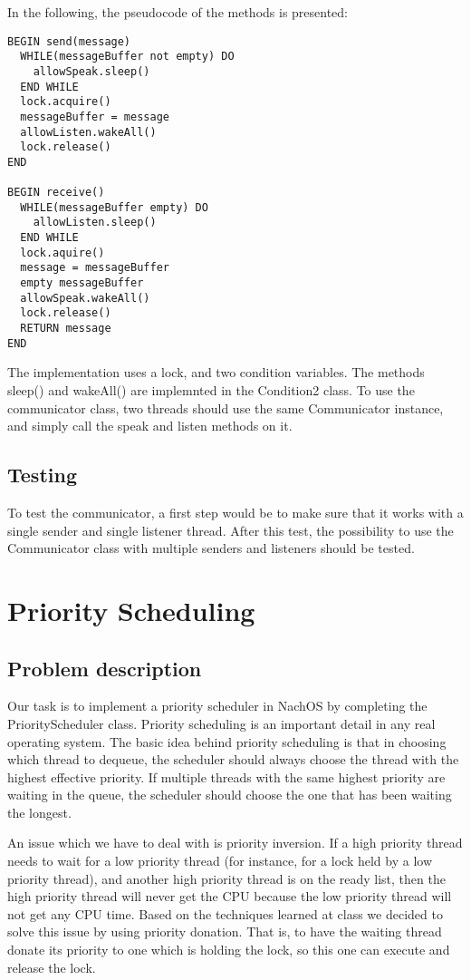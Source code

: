 \documentclass[a4paper,10pt]{article}
\begin{document}
In the following, the pseudocode of the methods is presented:

\begin{verbatim}
BEGIN send(message)
  WHILE(messageBuffer not empty) DO
    allowSpeak.sleep()
  END WHILE
  lock.acquire()
  messageBuffer = message
  allowListen.wakeAll()
  lock.release()
END

BEGIN receive()
  WHILE(messageBuffer empty) DO
    allowListen.sleep()
  END WHILE
  lock.aquire()
  message = messageBuffer
  empty messageBuffer
  allowSpeak.wakeAll()
  lock.release()
  RETURN message
END
\end{verbatim}

The implementation uses a lock, and two condition variables. The methods sleep() and wakeAll() are implemnted in the Condition2 class. To use the communicator class, two threads should use the same Communicator instance, and simply call the speak and listen methods on it.

\subsection{Testing}

To test the communicator, a first step would be to make sure that it works with a single sender and single listener thread. After this test, the possibility to use the Communicator class with multiple senders and listeners should be tested.

\section{Priority Scheduling}

\subsection{Problem description}

Our task is to implement a priority scheduler in NachOS by completing the PriorityScheduler class. Priority scheduling is an important detail in any real operating system. The basic idea behind priority scheduling is that in choosing which thread to dequeue, the scheduler should always choose the thread with the highest effective priority. If multiple threads with the same highest priority are waiting in the queue, the scheduler should choose the one that has been waiting the longest.

An issue which we have to deal with is priority inversion. If a high priority thread needs to wait for a low priority thread (for instance, for a lock held by a low priority thread), and another high priority thread is on the ready list, then the high priority thread will never get the CPU because the low priority thread will not get any CPU time. Based on the techniques learned at class we decided to solve this issue by using priority donation. That is, to have the waiting thread donate its priority to one which is holding the lock, so this one can execute and release the lock.
\end{document}
